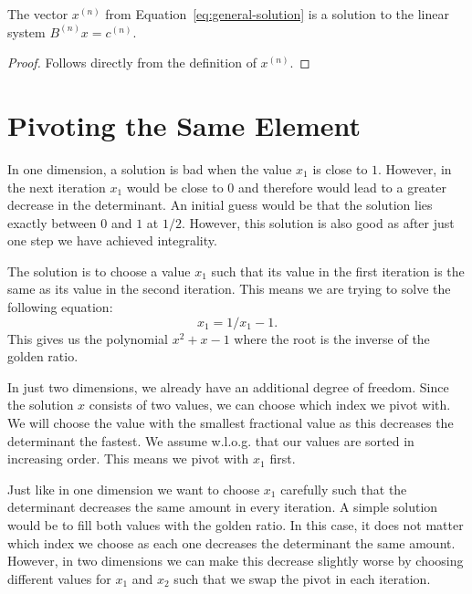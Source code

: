 \begin{lemma}
  The vector $x^{(n)}$ from Equation~\ref{eq:general-solution} is a solution to the
  linear system $B^{(n)} x = c^{(n)}$.
\end{lemma}

\begin{proof}
  Follows directly from the definition of $x^{(n)}$.
\end{proof}

\section{Pivoting the Same Element}

In one dimension, a solution is bad when the value $x_1$ is close to $1$.
However, in the next iteration $x_1$ would be close to $0$ and therefore
would lead to a greater decrease in the determinant.
An initial guess would be that the solution lies exactly between $0$ and $1$ at $1/2$.
However, this solution is also good as after just one step we have achieved integrality.

The solution is to choose a value $x_1$ such that its value in the first
iteration is the same as its value in the second iteration.
This means we are trying to solve the following equation:
\[
  x_1 = 1/x_1 - 1.
\]
This gives us the polynomial $x^2 + x - 1$ where the root is the inverse of the
golden ratio.

In just two dimensions, we already have an additional degree of freedom.
Since the solution $x$ consists of two values, we can choose which index we pivot with.
We will choose the value with the smallest fractional value as this decreases
the determinant the fastest.
We assume w.l.o.g. that our values are sorted in increasing order.
This means we pivot with $x_1$ first.

Just like in one dimension we want to choose $x_1$ carefully such that the
determinant decreases the same amount in every iteration.
A simple solution would be to fill both values with the golden ratio.
In this case, it does not matter which index we choose as each one decreases
the determinant the same amount.
However, in two dimensions we can make this decrease slightly worse
by choosing different values for $x_1$ and $x_2$ such that we swap the pivot
in each iteration.

